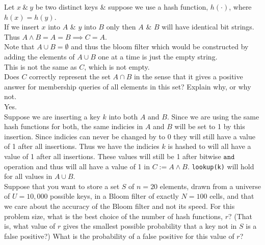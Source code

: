 \documentclass[11pt,a4paper]{article}
\begin{document}
\apart
Let $x\ \&\ y$ be two distinct keys \& suppose we use a hash function, $h(\cdot)$, where $h(x)=h(y)$.\\
If we insert $x$ into $A$ \& $y$ into $B$ only then $A$ \& $B$ will have identical bit strings.\\
Thus $A\wedge B=A=B\implies C=A$.\\
Note that $A\cup B=\emptyset$ and thus the bloom filter which would be constructed by adding the elements of $A\cup B$ one at a time is just the empty string.\\
This is not the same as $C$, which is not empty.\\

\qpart
Does $C$ correctly represent the set $A\cap B$ in the sense that it gives a positive answer for membership queries of all elements in this set? Explain why, or why not.\\

\apart
Yes.\\
Suppose we are inserting a key $k$ into both $A$ and $B$. Since we are using the same hash functions for both, the same indicies in $A$ and $B$ will be set to 1 by this insertion. Since indicies can never be changed by to 0 they will still have a value of 1 after all insertions. Thus we have the indicies $k$ is hashed to will all have a value of 1 after all insertions. These values will still be 1 after bitwise $\mathtt{and}$ operation and thus will all have a value of 1 in $C:=A\wedge B$. \lstinline!lookup(k)! will hold for all values in $A\cup B$.\\

\qpart
Suppose that you want to store a set $S$ of $n=20$ elements, drawn from a universe of $U=10,000$ possible keys, in a Bloom filter of exactly $N=100$ cells, and that we care about the accuracy of the Bloom filter and not its speed. For this problem size, what is the best choice of the number of hash functions, $r$? (That is, what value of $r$ gives the smallest possible probability that a key not in $S$ is a false positive?) What is the probability of a false positive for this value of $r$?\\
\end{document}

